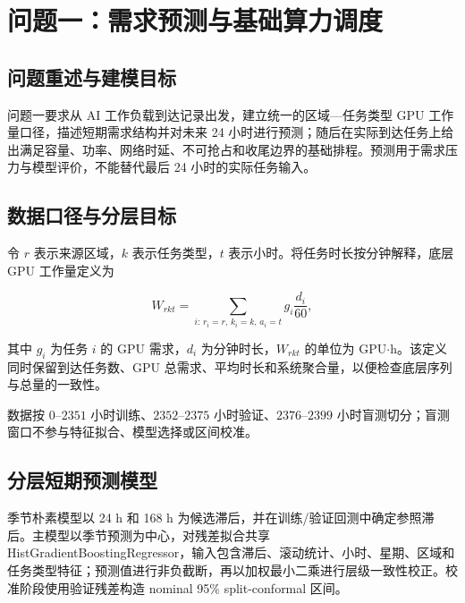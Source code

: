 

\providecommand{\PendingClaim}[1]{\texttt{[pending:#1]}}

\providecommand{\ExploratoryEvidence}[1]{\textit{\small [exploratory evidence: #1]}}

\section{问题一：需求预测与基础算力调度}

\subsection{问题重述与建模目标}

问题一要求从 AI 工作负载到达记录出发，建立统一的区域—任务类型 GPU 工作量口径，描述短期需求结构并对未来 24 小时进行预测；随后在实际到达任务上给出满足容量、功率、网络时延、不可抢占和收尾边界的基础排程。预测用于需求压力与模型评价，不能替代最后 24 小时的实际任务输入。

\subsection{数据口径与分层目标}

令 $r$ 表示来源区域，$k$ 表示任务类型，$t$ 表示小时。将任务时长按分钟解释，底层 GPU 工作量定义为

\begin{equation}\label{eq:q1-workload-staging} W_{rkt}=\sum_{i:\,r_i=r,\,k_i=k,\,a_i=t}g_i\frac{d_i}{60},\end{equation}

其中 $g_i$ 为任务 $i$ 的 GPU 需求，$d_i$ 为分钟时长，$W_{rkt}$ 的单位为 GPU$\cdot$h。该定义同时保留到达任务数、GPU 总需求、平均时长和系统聚合量，以便检查底层序列与总量的一致性。

数据按 $0$--$2351$ 小时训练、$2352$--$2375$ 小时验证、$2376$--$2399$ 小时盲测切分；盲测窗口不参与特征拟合、模型选择或区间校准。

\subsection{分层短期预测模型}

季节朴素模型以 24 h 和 168 h 为候选滞后，并在训练/验证回测中确定参照滞后。主模型以季节预测为中心，对残差拟合共享 HistGradientBoostingRegressor，输入包含滞后、滚动统计、小时、星期、区域和任务类型特征；预测值进行非负截断，再以加权最小二乘进行层级一致性校正。校准阶段使用验证残差构造 nominal 95\% split-conformal 区间。

